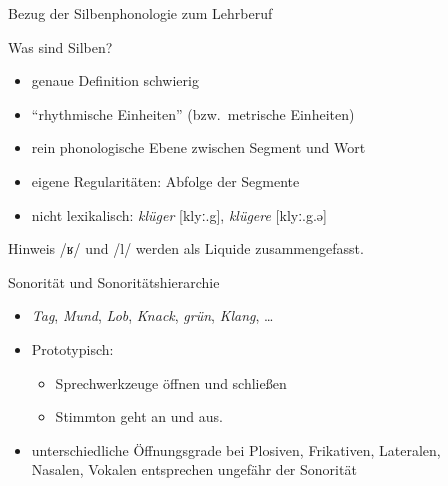 \begin{frame}
  {Bezug der Silbenphonologie zum Lehrberuf}
  \pause
  \centering
  \LARGE
  \\
  \pause
  \Zeile
\end{frame}


\begin{frame}
  {Was sind Silben?}
  \pause
  \begin{itemize}[<+->]
    \item genaue Definition schwierig
    \item "`rhythmische Einheiten"' (bzw.\ metrische Einheiten)
      \Zeile
    \item \alert{rein phonologische} Ebene \alert{zwischen Segment und Wort}
    \item eigene \alert{Regularitäten}: Abfolge der Segmente
      \Zeile
    \item \alert{nicht lexikalisch}: \textit{klüger} [klyː.g], \textit{klügere} [klyː.g.ə]
  \end{itemize}
\end{frame}

\begin{frame}
  {Hinweis}
  \pause
  \Zeile\Zeile
  \centering
  \Large /ʁ/ und /l/ werden als \alert{Liquide} zusammengefasst.
\end{frame}


\begin{frame}[fragile]
  {Sonorität und Sonoritätshierarchie}
  \pause
  \begin{itemize}[<+->]
    \item \textit{Tag}, \textit{Mund}, \textit{Lob}, \textit{Knack}, \textit{grün}, \textit{Klang}, \dots
      \Zeile
    \item Prototypisch:
      \begin{itemize}[<+->]
        \item \alert{Sprechwerkzeuge öffnen und schließen}
        \item \alert{Stimmton geht an und aus.}
      \end{itemize}
      \Zeile
    \item unterschiedliche Öffnungsgrade bei Plosiven, Frikativen, Lateralen,\\
      Nasalen, Vokalen entsprechen ungefähr der \alert{Sonorität}
  \end{itemize}
  \pause
  \begin{center}
  \end{center}
\end{frame}


